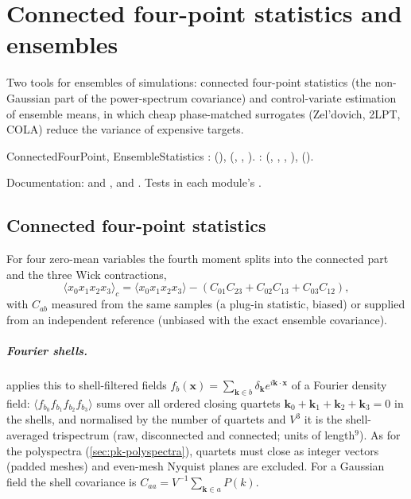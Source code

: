 \chapter{Connected four-point statistics and ensembles}\label{ch:ensembles}

Two tools for ensembles of simulations: connected four-point statistics (the non-Gaussian part of the power-spectrum
covariance) and control-variate estimation of ensemble means, in which cheap phase-matched surrogates (Zel'dovich, 2LPT,
COLA) reduce the variance of expensive targets.

\begin{modulebox}{ConnectedFourPoint, EnsembleStatistics}
:  (), 
(, , ).
:  (, , ,
),  ().\par
Documentation:  and ,  and
. Tests in each module's .
\end{modulebox}

\section{Connected four-point statistics}\label{sec:ens-fourpoint}

For four zero-mean variables the fourth moment splits into the connected part and the three Wick contractions,
\begin{equation}
\langle x_0x_1x_2x_3\rangle_c=\langle x_0x_1x_2x_3\rangle-\left(C_{01}C_{23}+C_{02}C_{13}+C_{03}C_{12}\right),
\end{equation}
with $C_{ab}$ measured from the same samples (a plug-in statistic, biased) or supplied from an independent reference (unbiased with the
exact ensemble covariance).

\paragraph*{Fourier shells.}  applies this to shell-filtered fields $f_b(\bm x)=\sum_{\bm k\in b}\delta_{\bm k}
e^{i\bm k\cdot\bm x}$ of a Fourier density field: $\langle f_{b_0}f_{b_1}f_{b_2}f_{b_3}\rangle$ sums over all ordered closing quartets
$\bm k_0+\bm k_1+\bm k_2+\bm k_3=0$ in the shells, and normalised by the number of quartets and $V^3$ it is the shell-averaged trispectrum
(raw, disconnected and connected; units of length$^9$). As for the polyspectra (\cref{sec:pk-polyspectra}), quartets must close as integer
vectors (padded meshes) and even-mesh Nyquist planes are excluded. For a Gaussian field the shell covariance is $C_{aa}=V^{-1}\sum_{\bm k\in a}P(k)$.

